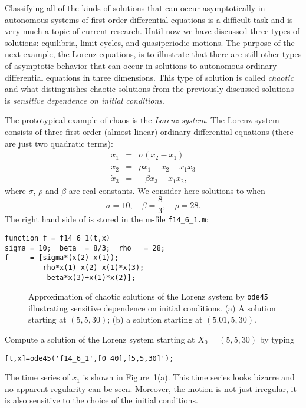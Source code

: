 \documentclass{ximera}
\begin{document}
Classifying all of the kinds of solutions that can occur asymptotically in 
autonomous systems of first order differential equations is a difficult task 
and is very much a topic of current research.  Until now we have discussed 
three types of solutions: equilibria, limit cycles, and quasiperiodic
motions.  The purpose of the next example, the Lorenz equations, is to 
illustrate that there are still other types of asymptotic behavior that can 
occur in solutions to autonomous ordinary differential equations in three 
dimensions.  This type of solution is called {\em chaotic\/} and what 
distinguishes chaotic solutions from the previously discussed solutions is 
{\em sensitive dependence on initial conditions\/}. 

The prototypical example of chaos is the {\em Lorenz system}. 
  The Lorenz system consists of three first order 
(almost linear) ordinary differential equations (there are just two quadratic 
terms):
\begin{equation*}  \label{e:Lorenz}
\begin{array}{rcl}
\dot{x}_1 & = & \sigma(x_2-x_1)\\
\dot{x}_2 & = & \rho x_1 - x_2 - x_1x_3\\
\dot{x}_3 & = & -\beta x_3 + x_1x_2,
\end{array}
\end{equation*}
where $\sigma$, $\rho$ and $\beta$ are real constants.  We consider here
solutions to  when
\[
\sigma=10,\quad \beta=\frac{8}{3},\quad \rho=28.
\]
The right hand side of  is stored in the m-file {\tt f14\_6\_1.m}:
\begin{verbatim}
function f = f14_6_1(t,x)
sigma = 10;  beta  = 8/3;  rho   = 28;
f     = [sigma*(x(2)-x(1));
         rho*x(1)-x(2)-x(1)*x(3);
         -beta*x(3)+x(1)*x(2)];
\end{verbatim}

\begin{figure}[bht]
   \centerline{%
   }
   \caption{Approximation of chaotic solutions of the Lorenz system by 
	{\tt ode45} illustrating sensitive dependence on initial conditions.  
	(a) A solution starting at $(5,5,30)$;  (b) a solution starting at 
	$(5.01,5,30)$.}
   \label{fig:lorenz1}
\end{figure}

Compute a solution of the Lorenz system starting at 
$X_0=(5,5,30)$ by typing
\begin{verbatim}
[t,x]=ode45('f14_6_1',[0 40],[5,5,30]');
\end{verbatim}
The time series of $x_1$ is shown in Figure~\ref{fig:lorenz1}(a).  This time 
series looks bizarre and no apparent regularity can be seen.  Moreover, the 
motion is not just irregular, it is also sensitive to the choice of the initial 
conditions.  
\end{document}
